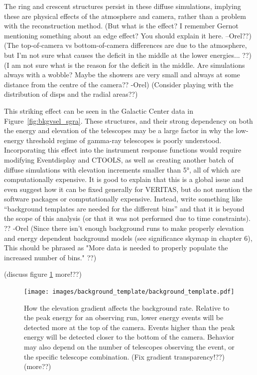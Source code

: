     The ring and crescent structures persist in these diffuse simulations, implying these are physical effects of the atmosphere and camera, rather than a problem with the reconstruction method.
    {\color{red}(But what is the effect? I remember Gernot mentioning something about an edge effect? You should explain it here. --Orel??)}
    {\color{red}(The top-of-camera vs bottom-of-camera differences are due to the atmosphere, but I'm not sure what causes the deficit in the middle at the lower energies... ??)}
    {\color{red}(I am not sure what is the reason for the deficit in the middle. Are simulations always with a wobble? Maybe the showers are very small and always at some distance from the centre of the camera?? -Orel)}
    {\color{red}(Consider playing with the distribution of disps and the radial areas??)}

    This striking effect can be seen in the Galactic Center data in Figure~\ref{fig:bkgvsel_sgra}.
    These structures, and their strong dependency on both the energy and elevation of the telescopes may be a large factor in why the low-energy threshold regime of gamma-ray telescopes is poorly understood.
    Incorporating this effect into the instrument response functions would require modifying Eventdisplay and CTOOLS, as well as creating another batch of diffuse simulations with elevation increments smaller than \ang{5}, all of which are computationally expensive.
    {\color{red}It is good to explain that this is a global issue and even suggest how it can be fixed generally for VERITAS, but do not mention the software packages or computationally expensive. Instead, write something like “background templates are needed for the different bins” and that it is beyond the scope of this analysis (or that it was not performed due to time constraints). ?? -Orel}
    {\color{red}(Since there isn't enough background runs to make properly elevation and energy dependent background models (see significance skymap in chapter 6), This should be phrased as "More data is needed to properly populate the increased number of bins." ??)}
  
  
  {\color{red}(discuss figure \ref{fig:bkg_diagram} more!??)}

  \begin{figure}[ht]
    \centering
    \texttt{[image: images/background\_template/background\_template.pdf]}
    \caption[Background Phenomenology]{
      How the elevation gradient affects the background rate.
      Relative to the peak energy for an observing run, lower energy events will be detected more at the top of the camera.
      Events higher than the peak energy will be detected closer to the bottom of the camera.
      Behavior may also depend on the number of telescopes observing the event, or the specific telescope combination.
      {\color{red}(Fix gradient transparency!??)}
      {\color{red}(more??)}
    }
    \label{fig:bkg_diagram}
  

  \end{figure}
  \FloatBarrier

